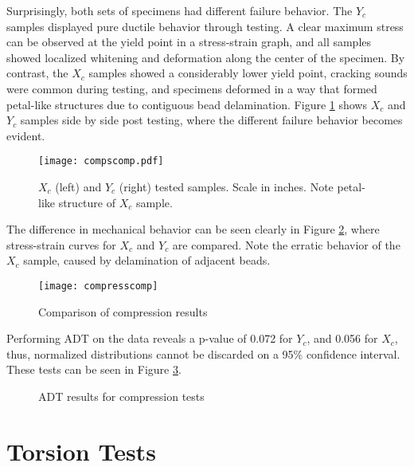 \documentclass[main.tex]{subfiles}
\begin{document}
Surprisingly, both sets of specimens had different failure behavior. The $Y_c$ samples displayed pure ductile behavior through testing. A clear maximum stress can be observed at the yield point in a stress-strain graph, and all samples showed localized whitening and deformation along the center of the specimen. By contrast, the $X_c$ samples showed a considerably lower yield point, cracking sounds were common during testing, and specimens deformed in a way that formed petal-like structures due to contiguous bead delamination. Figure \ref{fig:CompSComp} shows $X_c$ and $Y_c$ samples side by side post testing, where the different failure behavior becomes evident.

\begin{figure}[!htbp]
	\center
	\texttt{[image: compscomp.pdf]}
	\captionsetup{justification=centering} %
	\caption[$X_c$ and $Y_c$ tested samples]{$X_c$ (left) and $Y_c$ (right) tested samples. Scale in inches. Note petal-like structure of $X_c$ sample.} \label{fig:CompSComp}
\end{figure}

The difference in mechanical behavior can be seen clearly in Figure \ref{fig:comprComp}, where stress-strain curves for $X_c$ and $Y_c$ are compared. Note the erratic behavior of the $X_c$ sample, caused by delamination of adjacent beads.  

\begin{figure}[!htbp]
	\center
	\texttt{[image: compresscomp]}
	\caption{Comparison of compression results} \label{fig:comprComp}
\end{figure}  

Performing ADT on the data reveals a p-value of 0.072 for $Y_c$, and 0.056 for $X_c$, thus, normalized distributions cannot be discarded on a 95\% confidence interval. These tests can be seen in Figure \ref{fig:adtcomp}. %

\begin{figure}[!htbp]
	\center
	\hfill
	\caption{ADT results for compression tests} \label{fig:adtcomp}
\end{figure}

\section{Torsion Tests} \label{sec:torsr}
\end{document}
